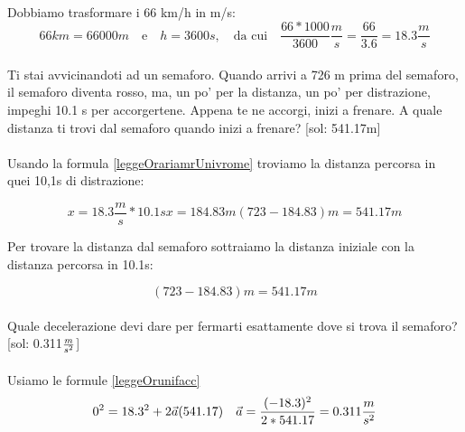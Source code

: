 \paragraph{}
Dobbiamo trasformare i  66 km/h in m/s: 
\begin{equation*}
    66km = 66000 m\quad \text{e} \quad h = 3600 s,\quad \text{da cui}\quad \frac{66*1000}{3600} \frac{m}{s} = \frac{66}{3.6} = 18.3\frac{m}{s}
\end{equation*}
\paragraph{}
Ti stai avvicinandoti ad un semaforo. Quando arrivi a 726 m prima del semaforo, il semaforo diventa rosso, ma, un po' per la distanza, un po' per distrazione, impeghi 10.1 s per accorgertene. Appena te ne accorgi, inizi a frenare. A quale distanza ti trovi dal semaforo quando inizi a frenare? [sol: 541.17m]

\paragraph{}
Usando la formula \ref{leggeOrariamrUnivrome} troviamo la distanza percorsa in quei 10,1s di distrazione:

\begin{equation*}
    x = 18.3\frac{m}{s}*10.1s
    x = 184.83m 
    (723-184.83)m = 541.17m
\end{equation*}  

Per trovare la distanza dal semaforo sottraiamo la distanza iniziale con la distanza percorsa in 10.1s:

\begin{equation*}
    (723-184.83)m = 541.17m
\end{equation*}

\paragraph{}
Quale decelerazione devi dare per fermarti esattamente dove si trova il semaforo?[sol: 0.311$\frac{m}{s^2}$]
\paragraph{}
Usiamo le formule \ref{leggeOrunifacc}
\begin{equation*}
    0^2 = 18.3^2 + 2\vec{a}(541.17)\quad \vec{a} =\frac{(-18.3)^2}{2*541.17}= 0.311\frac{m}{s^2}
\end{equation*}

